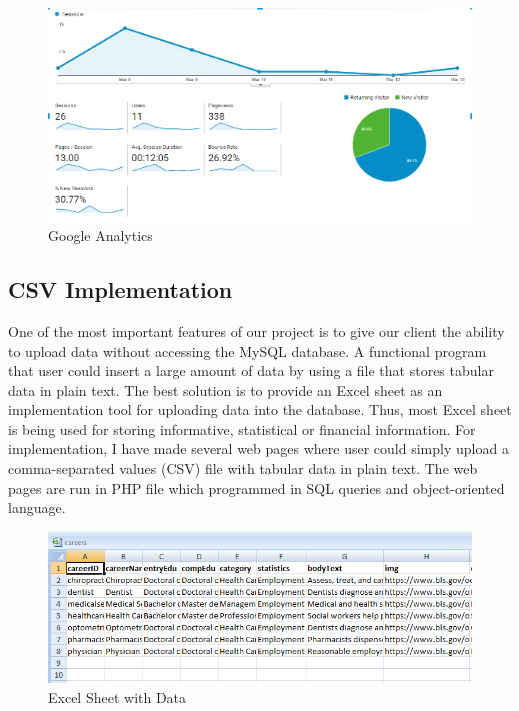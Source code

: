 \documentclass[onecolumn, draftclsnofoot,10pt, compsoc]{IEEEtran}
\begin{document}
\begin{figure}[h]
\centerline{\includegraphics[scale=1]{Figure_6.PNG} }
\caption{Google Analytics}
\end{figure}

\subsection{CSV Implementation}
\noindent One of the most important features of our project is to give our client the ability to upload data without accessing the MySQL database. 
A functional program that user could insert a large amount of data by using a file that stores tabular data in plain text. 
The best solution is to provide an Excel sheet as an implementation tool for uploading data into the database.
Thus, most Excel sheet is being used for storing informative, statistical or financial information.
For implementation, I have made several web pages where user could simply upload a comma-separated values (CSV) file with tabular data in plain text. 
The web pages are run in PHP file which programmed in SQL queries and object-oriented language.\\ 

\begin{figure}[h]
\centerline{\includegraphics[scale=0.9]{Figure_4.PNG} }
\caption{Excel Sheet with Data}
\end{figure}
\end{document}
